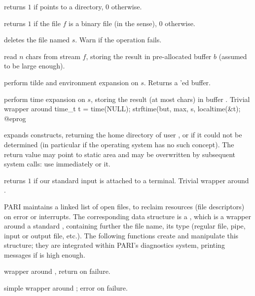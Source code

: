  returns $1$ if  points to
a directory, $0$ otherwise.

 returns $1$ if the file $f$ is a binary
file (in the  sense), $0$ otherwise.

 deletes the file named $s$. Warn
if the operation fails.

 read $n$ chars from
stream $f$, storing the result in pre-allocated buffer $b$ (assumed to be
large enough).

 perform tilde and environment expansion
on $s$. Returns a 'ed buffer.

 perform
time expansion on $s$, storing the result (at most  chars) in
buffer . Trivial wrapper around
\bprog
  time_t t = time(NULL);
  strftime(but, max, s, localtime(&t);
@eprog

 expands 
constructs, returning the home directory of user , or  if
it could not be determined (in particular if the operating system has no such
concept). The return value may point to static area and may be overwritten
by subsequent system calls: use immediately or  it.

 returns $1$ if our standard input
 is attached to a terminal. Trivial wrapper around .


PARI maintains a linked list of open files, to reclaim resources
(file descriptors) on error or interrupts. The corresponding data structure
is a , which is a wrapper around a standard ,
containing further the file name, its type (regular file, pipe, input or
output file, etc.). The following functions create and manipulate this
structure; they are integrated within PARI's diagnostics system, printing
messages if  is high enough.

 wrapper
around , return  on failure.

simple wrapper around ; error on failure.

